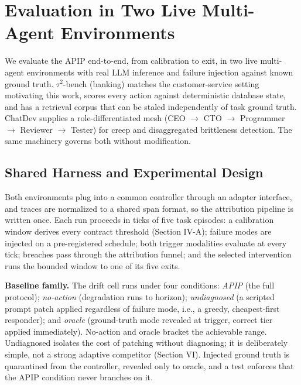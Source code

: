 \documentclass[conference]{IEEEtran}
\begin{document}
\section{Evaluation in Two Live Multi-Agent Environments}

We evaluate the APIP end-to-end, from calibration to exit, in two live multi-agent environments with real LLM inference and failure injection against known ground truth. $\tau^2$-bench (banking) \cite{ref18} matches the customer-service setting motivating this work, scores every action against deterministic database state, and has a retrieval corpus that can be staled independently of task ground truth. ChatDev \cite{ref19} supplies a role-differentiated mesh (CEO $\rightarrow$ CTO $\rightarrow$ Programmer $\rightarrow$ Reviewer $\rightarrow$ Tester) for creep and disaggregated brittleness detection. The same machinery governs both without modification.

\subsection{Shared Harness and Experimental Design}

Both environments plug into a common controller through an adapter interface, and traces are normalized to a shared span format, so the attribution pipeline is written once. Each run proceeds in ticks of five task episodes: a calibration window derives every contract threshold (Section IV-A); failure modes are injected on a pre-registered schedule; both trigger modalities evaluate at every tick; breaches pass through the attribution funnel; and the selected intervention runs the bounded window to one of its five exits.

\textbf{Baseline family.} The drift cell runs under four conditions: \emph{APIP} (the full protocol); \emph{no-action} (degradation runs to horizon); \emph{undiagnosed} (a scripted prompt patch applied regardless of failure mode, i.e., a greedy, cheapest-first responder); and \emph{oracle} (ground-truth mode revealed at trigger, correct tier applied immediately). No-action and oracle bracket the achievable range. Undiagnosed isolates the cost of patching without diagnosing; it is deliberately simple, not a strong adaptive competitor (Section VI). Injected ground truth is quarantined from the controller, revealed only to oracle, and a test enforces that the APIP condition never branches on it.
\end{document}
